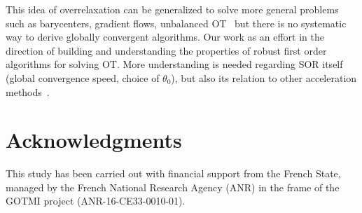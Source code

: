\documentclass{article} %
\theoremstyle{plain}
\theoremstyle{definition}
\theoremstyle{remark}
\begin{document}
This idea of overrelaxation can be generalized to solve more general problems such as barycenters, gradient flows, unbalanced OT~\cite[chap. 4]{chizat2017these} but there is no systematic way to derive globally convergent algorithms. Our work as an effort in the direction of building and understanding the properties of robust first order algorithms for solving OT. More understanding is needed regarding SOR itself (global convergence speed, choice of $\theta_0$), but also its relation to other acceleration methods~\cite{2016arXiv160604133S,2017arXiv170509634A}.






\section*{Acknowledgments}
This study has been carried out with financial support from the French State, managed by the French National Research Agency (ANR) in the frame of the  GOTMI project (ANR-16-CE33-0010-01).




\end{document}

